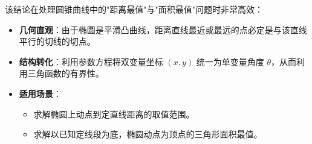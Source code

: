 \begin{explanationbox}
该结论在处理圆锥曲线中的"距离最值"与"面积最值"问题时非常高效：
\begin{itemize}
    \item \textbf{几何直观}：由于椭圆是平滑凸曲线，距离直线最近或最远的点必定是与该直线平行的切线的切点。
    \item \textbf{结构转化}：利用参数方程将双变量坐标 $(x, y)$ 统一为单变量角度 $\theta$，从而利用三角函数的有界性。
    \item \textbf{适用场景}：
    \begin{itemize}
        \item 求解椭圆上动点到定直线距离的取值范围。
        \item 求解以已知定线段为底，椭圆动点为顶点的三角形面积最值。
    \end{itemize}
\end{itemize}
\end{explanationbox}